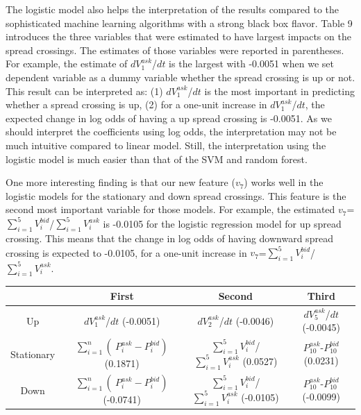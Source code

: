 \documentclass[11pt]{article}
\begin{document}
The logistic model also helps the interpretation of the results compared to the sophisticated machine learning algorithms with a strong black box flavor. Table 9 introduces the three variables that were estimated to have largest impacts on the spread crossings. The estimates of those variables were reported in parentheses. For example, the estimate of $d V_{1}^{ask}$/$dt$ is the largest with -0.0051 when we set dependent variable as a dummy variable whether the spread crossing is up or not. This result can be interpreted as: (1) $d V_{1}^{ask}$/$dt$ is the most important in predicting whether a spread crossing is up, (2) for a one-unit increase in $d V_{1}^{ask}$/$dt$, the expected change in log odds of having a up spread crossing is -0.0051. As we should interpret the coefficients using log odds, the interpretation may not be much intuitive compared to linear model. Still, the interpretation using the logistic model is much easier than that of the SVM and random forest.

One more interesting finding is that our new feature ($v_{7}$) works well in the logistic models for the stationary and down spread crossings. This feature is the second most important variable for those models. For example, the estimated $v_{7}$=$\sum_{i=1}^{5} V_{i}^{bid}$/$\sum_{i=1}^{5} V_{i}^{ask}$ is -0.0105 for the logistic regression model for up spread crossing. This means that the change in log odds of having downward spread crossing is expected to -0.0105, for a one-unit increase in $v_{7}$=$\sum_{i=1}^{5} V_{i}^{bid}$/$\sum_{i=1}^{5} V_{i}^{ask}$.  

\begin{center}
   \label{tab:title} 
  \begin{tabular}{|c | c | c | c|} 
    \hline
     & First & Second & Third  \\
    \hline
    Up & $d V_{1}^{ask}$/$dt$ (-0.0051) & $d V_{2}^{ask}$/$dt$ (-0.0046) & $d V_{5}^{ask}$/$dt$ (-0.0045)\\ 
    \hline
    Stationary & $\sum_{i=1}^{n} (\ P_{i}^{ask}-P_{i}^{bid} )$ (0.1871) & $\sum_{i=1}^{5} V_{i}^{bid}$/$\sum_{i=1}^{5} V_{i}^{ask}$ (0.0527) & $P_{10}^{ask}$-$P_{10}^{bid}$ (0.0231) \\
    \hline
    Down & $\sum_{i=1}^{n} (\ P_{i}^{ask}-P_{i}^{bid} )$ (-0.0741) & $\sum_{i=1}^{5} V_{i}^{bid}$/$\sum_{i=1}^{5} V_{i}^{ask}$ (-0.0105) & $P_{10}^{ask}$-$P_{10}^{bid}$ (-0.0099) \\
    \hline
  \end{tabular}
\end{center}
\end{document}
